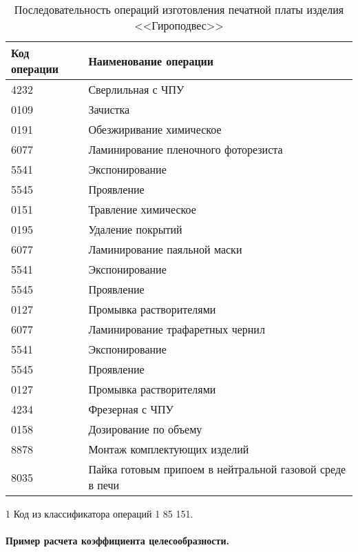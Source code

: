 \begin{table} [!htb]
	\centering
	\caption{Последовательность операций изготовления печатной платы изделия <<Гироподвес>>} \vspace{4pt}
	\label{tab:pcb}
	\begin{threeparttable}
		\begin{tabularx}{\linewidth}{ll}
			\toprule
			\textbf{Код операции\tnote{1}} & \textbf{Наименование операции} \\
			\midrule
			4232 & Сверлильная с ЧПУ \\
			0109 & Зачистка \\
			0191 & Обезжиривание химическое \\
			6077 & Ламинирование пленочного фоторезиста \\
			5541 & Экспонирование \\
			5545 & Проявление \\
			0151 & Травление химическое \\
			0195 & Удаление покрытий \\
			6077 & Ламинирование паяльной маски \\
			5541 & Экспонирование \\
			5545 & Проявление \\
			0127 & Промывка растворителями \\
			6077 & Ламинирование трафаретных чернил \\
			5541 & Экспонирование \\
			5545 & Проявление \\
			0127 & Промывка растворителями \\
			4234 & Фрезерная с ЧПУ \\
			0158 & Дозирование по объему \\
			8878 & Монтаж комплектующих изделий \\ 
			8035 & Пайка готовым припоем в нейтральной газовой среде в печи \\
			\bottomrule
		\end{tabularx}
		\begin{tablenotes} \footnotesize
			\item [1] Код из классификатора операций 1 85 151.
		\end{tablenotes}
	\end{threeparttable}
\end{table}



\paragraph{Пример расчета коэффициента целесообразности.}

